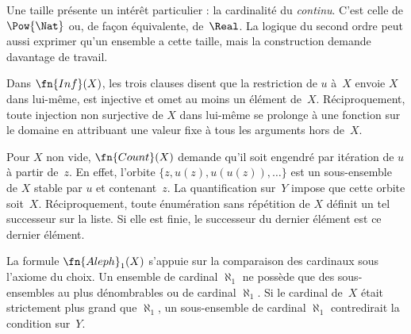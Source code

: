 \documentclass[../../../include/open-logic-section]{subfiles}
\begin{document}
Une taille présente un intérêt particulier :
la cardinalité du \emph{continu}. C'est celle
de $\Pow{\Nat}$ ou, de façon équivalente,
de~$\Real$. La logique du second ordre peut
aussi exprimer qu'un ensemble a cette taille,
mais la construction demande davantage de
travail.

Dans $\fn{Inf}(X)$, les trois clauses disent que la
restriction de $u$ à~$X$ envoie $X$ dans lui-même, est injective
et omet au moins un élément de~$X$. Réciproquement, toute
injection non surjective de $X$ dans lui-même se prolonge
à une fonction sur le domaine en attribuant une valeur fixe
à tous les arguments hors de~$X$.

Pour $X$ non vide, $\fn{Count}(X)$ demande qu'il soit engendré
par itération de $u$ à partir de~$z$. En effet, l'orbite
$\{z,u(z),u(u(z)),\ldots\}$ est un sous-ensemble de $X$
stable par $u$ et contenant~$z$. La quantification sur~$Y$
impose que cette orbite soit~$X$. Réciproquement, toute
énumération sans répétition de $X$ définit un tel successeur
sur la liste. Si elle est finie, le successeur du dernier
élément est ce dernier élément.

La formule $\fn{Aleph}_1(X)$ s'appuie sur la comparaison
des cardinaux sous l'axiome du choix. Un ensemble de cardinal
$\aleph_1$ ne possède que des sous-ensembles au plus
dénombrables ou de cardinal $\aleph_1$. Si le cardinal
de~$X$ était strictement plus grand que $\aleph_1$, un
sous-ensemble de cardinal $\aleph_1$ contredirait la condition
sur~$Y$.
\end{document}
